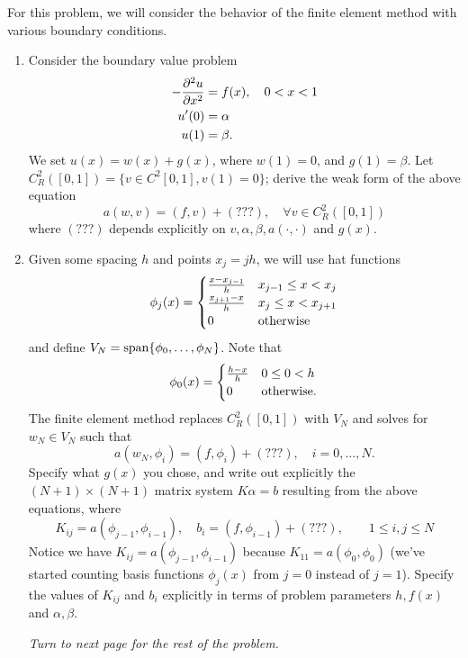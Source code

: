 
For this problem, we will consider the behavior of the finite element method with various boundary conditions.  
\begin{enumerate}
\item Consider the boundary value problem
\begin{align*}
-\frac{\partial^{2} u}{\partial x^{2}} &= f(x), \quad 0 < x < 1\\
u'(0) &= \alpha\\
u(1)  &= \beta.  
\end{align*}
We set $u(x) = w(x) + g(x)$, where $w(1) = 0$, and $g(1) = \beta$.  Let $C^2_R([0,1]) = \{v\in C^2[0,1], v(1) = 0\}$; derive the weak form of the above equation
\[
a(w,v) = (f,v) + (???), \quad \forall v\in C^2_R([0,1]) 
\]
where $(???)$ depends explicitly on $v, \alpha, \beta, a(\cdot,\cdot)$ and $g(x)$.  
\item Given some spacing $h$ and points $x_j = jh$, we will use hat functions
\[
\phi_j(x) = \begin{cases}
\frac{x-x_{j-1}}{h} & x_{j-1} \leq x < x_j\\
\frac{x_{j+1}-x}{h} & x_{j} \leq x < x_{j+1}\\
0 & {\rm otherwise}
\end{cases}
\]
and define $V_N = {\rm span}\{\phi_0,\ldots,\phi_{N}\}$.  Note that 
\[
\phi_0(x) = \begin{cases}
\frac{h-x}{h} & 0\leq 0 < h\\
0 & {\rm otherwise}.
\end{cases}
\]
The finite element method replaces $C^2_R([0,1])$ with $V_N$ and solves for $w_N\in V_N$ such that
\[
a(w_N,\phi_i) = (f,\phi_i) + (???), \quad i = 0,\ldots, N.
\]
Specify what $g(x)$ you chose, and write out explicitly the $(N+1)\times (N+1)$ matrix system $K\alpha = b$ resulting from the above equations, where
 \[
K_{ij} = a(\phi_{j-1},\phi_{i-1}), \quad b_i = (f,\phi_{i-1}) + (???), \qquad 1 \leq i, j \leq N
\]
Notice we have $K_{ij} = a(\phi_{j-1},\phi_{i-1})$ because $K_{11} = a(\phi_0,\phi_0)$ (we've started counting basis functions $\phi_j(x)$ from $j=0$ instead of $j=1$).  Specify the values of $K_{ij}$ and $b_i$ explicitly in terms of problem parameters $h,f(x)$ and $\alpha,\beta$.  
\vspace{2cm}
 \begin{center}
 \emph{Turn to next page for the rest of the problem.}
 \end{center}


\end{enumerate}
